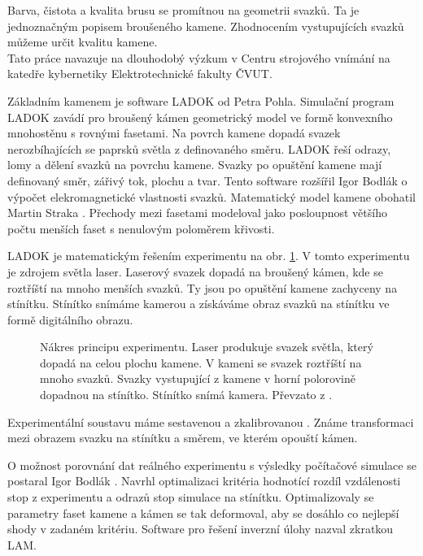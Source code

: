 Barva, čistota a kvalita brusu se promítnou na geometrii svazků. Ta je jednoznačným popisem broušeného kamene. Zhodnocením vystupujících svazků můžeme určit kvalitu kamene.\\ 

Tato práce navazuje na dlouhodobý výzkum v Centru strojového vnímání na katedře kybernetiky Elektrotechnické fakulty ČVUT. 

Základním kamenem je software LADOK \cite{Pohl2002} od Petra Pohla. Simulační program LADOK zavádí pro broušený kámen geometrický model ve formě konvexního mnohostěnu s rovnými fasetami. Na povrch kamene dopadá svazek nerozbíhajících se paprsků světla z definovaného směru. LADOK řeší odrazy, lomy a dělení svazků na povrchu kamene. Svazky po opuštění kamene mají definovaný směr, zářivý tok, plochu a tvar. Tento software rozšířil Igor Bodlák \cite{bodlakLADOK} o výpočet elekromagnetické vlastnosti svazků. Matematický model kamene obohatil Martin Straka \cite{strakaLADOK}. Přechody mezi fasetami modeloval jako posloupnost většího počtu menších faset s nenulovým poloměrem křivosti. 

LADOK je matematickým řešením experimentu na obr. \ref{fig:basicMeasure}. V tomto experimentu je zdrojem světla laser. Laserový svazek dopadá na broušený kámen, kde se roztříští na mnoho menších svazků. Ty jsou po opuštění kamene zachyceny na stínítku. Stínítko snímáme kamerou a získáváme obraz svazků na stínítku ve formě digitálního obrazu.  


\begin{figure}[h!]
\begin{center}
\scalebox{0.4}{ }
\end{center}
\caption{Nákres principu experimentu. Laser produkuje svazek světla, který dopadá na celou plochu kamene. V kameni se svazek roztříští na mnoho svazků. Svazky vystupující z kamene v horní polorovině dopadnou na stínítko. Stínítko snímá kamera. Převzato z \cite{Drapela}.}
\label{fig:basicMeasure}
\end{figure}


Experimentální soustavu máme sestavenou a zkalibrovanou \cite{Drapela}. Známe transformaci mezi obrazem svazku na stínítku a směrem, ve kterém opouští kámen. 

O možnost porovnání dat reálného experimentu s výsledky počítačové simulace se postaral Igor Bodlák \cite{Bodlak2005}. Navrhl optimalizaci kritéria hodnotící rozdíl vzdálenosti stop z experimentu a odrazů stop simulace na stínítku. Optimalizovaly se parametry faset kamene a kámen se tak deformoval, aby se dosáhlo co nejlepší shody v zadaném kritériu. Software pro řešení inverzní úlohy nazval zkratkou LAM. 

